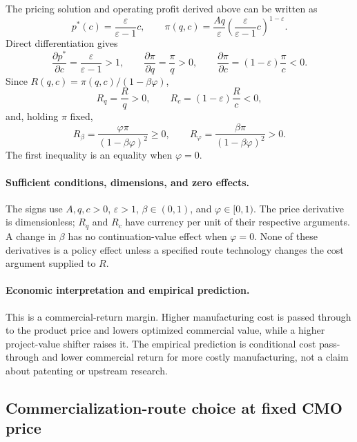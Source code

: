 The pricing solution and operating profit derived above can be written as
\[
  p^*(c)=\frac{\varepsilon}{\varepsilon-1}c,
  \qquad
  \pi(q,c)
  =
  \frac{Aq}{\varepsilon}
  \left(\frac{\varepsilon}{\varepsilon-1}c\right)^{1-\varepsilon}.
\]
Direct differentiation gives
\begin{equation}
  \frac{\partial p^*}{\partial c}
  =
  \frac{\varepsilon}{\varepsilon-1}>1,
  \qquad
  \frac{\partial\pi}{\partial q}
  =
  \frac{\pi}{q}>0,
  \qquad
  \frac{\partial\pi}{\partial c}
  =
  (1-\varepsilon)\frac{\pi}{c}<0.
  \label{eq:p15-price-profit-derivatives}
\end{equation}
Since \(R(q,c)=\pi(q,c)/(1-\beta\varphi)\),
\begin{equation}
  R_q=\frac{R}{q}>0,
  \qquad
  R_c=(1-\varepsilon)\frac{R}{c}<0,
  \label{eq:p15-return-derivatives}
\end{equation}
and, holding \(\pi\) fixed,
\[
  R_\beta
  =
  \frac{\varphi\pi}{(1-\beta\varphi)^2}\geq0,
  \qquad
  R_\varphi
  =
  \frac{\beta\pi}{(1-\beta\varphi)^2}>0.
\]
The first inequality is an equality when \(\varphi=0\).

\paragraph{Sufficient conditions, dimensions, and zero effects.}
The signs use \(A,q,c>0\), \(\varepsilon>1\),
\(\beta\in(0,1)\), and \(\varphi\in[0,1)\). The price derivative is
dimensionless; \(R_q\) and \(R_c\) have currency per unit of their respective
arguments. A change in \(\beta\) has no continuation-value effect when
\(\varphi=0\). None of these derivatives is a policy effect unless a specified
route technology changes the cost argument supplied to \(R\).

\paragraph{Economic interpretation and empirical prediction.}
This is a commercial-return margin. Higher manufacturing cost is passed
through to the product price and lowers optimized commercial value, while a
higher project-value shifter raises it. The empirical prediction is conditional
cost pass-through and lower commercial return for more costly manufacturing,
not a claim about patenting or upstream research.

\subsection{Commercialization-route choice at fixed CMO price}
\label{subsec:p15-route-choice}

